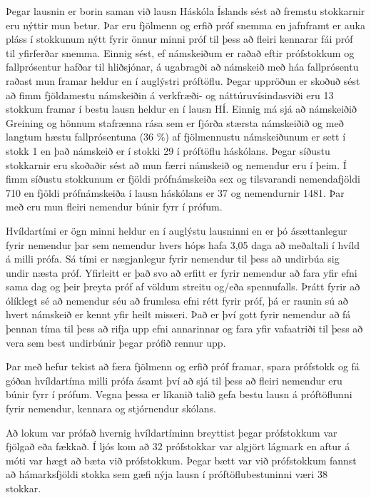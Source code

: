 \documentclass[12pt]{article}
\begin{document}
Þegar lausnin er borin saman við lausn Háskóla Íslands sést að fremstu stokkarnir eru nýttir mun betur. Þar eru fjölmenn og erfið próf snemma en jafnframt er auka pláss í stokkunum nýtt fyrir önnur minni próf til þess að fleiri kennarar fái próf til yfirferðar snemma. 
\medskip
Einnig sést, ef námskeiðum er raðað eftir prófstokkum og fallprósentur hafðar til hliðsjónar, á ugabragði að námskeið með háa fallprósentu raðast mun framar heldur en í auglýstri próftöflu.  
\medskip
Þegar uppröðun er skoðuð sést að fimm fjöldamestu námskeiðin á verkfræði- og náttúruvísindasviði eru 13 stokkum framar í bestu lausn heldur en í lausn HÍ. Einnig má sjá að námskeiðið Greining og hönnum stafrænna rása sem er fjórða stærsta námskeiðið og með langtum hæstu fallprósentuna (36 \%) af fjölmennustu námskeiðunum er sett í stokk 1 en það námskeið er í stokki 29 í próftöflu háskólans.  
\medskip
Þegar síðustu stokkarnir eru skoðaðir sést að mun færri námskeið og nemendur eru í þeim. Í fimm síðustu stokkunum er fjöldi prófnámskeiða sex og tilsvarandi nemendafjöldi 710 en fjöldi prófnámskeiða í lausn háskólans er 37 og nemendurnir 1481. Þar með eru mun fleiri nemendur búnir fyrr í prófum. 
\medskip

Hvíldartími er ögn minni heldur en í auglýstu lausninni en er þó ásættanlegur fyrir nemendur þar sem nemendur hvers hóps hafa 3,05 daga að meðaltali í hvíld á milli prófa. Sá tími er nægjanlegur fyrir nemendur til þess að undirbúa sig undir næsta próf. Yfirleitt er það svo að erfitt er fyrir nemendur að fara yfir efni sama dag og þeir þreyta próf af völdum streitu og/eða spennufalls. Þrátt fyrir að ólíklegt sé að nemendur séu að frumlesa efni rétt fyrir próf, þá er raunin sú að hvert námskeið er kennt yfir heilt misseri. Það er því gott fyrir nemendur að fá þennan tíma til þess að rifja upp efni annarinnar og fara yfir vafaatriði til þess að vera sem best undirbúnir þegar prófið rennur upp.
\medskip 

Þar með hefur tekist að færa fjölmenn og erfið próf framar, spara prófstokk og fá góðan hvíldartíma milli prófa ásamt því að sjá til þess að fleiri nemendur eru búnir fyrr í prófum. Vegna þessa er líkanið talið gefa bestu lausn á próftöflunni fyrir nemendur, kennara og stjórnendur skólans. 


\newpage

Að lokum var prófað hvernig hvíldartíminn breyttist þegar prófstokkum var fjölgað eða fækkað. Í ljós kom að 32 prófstokkar var algjört lágmark en aftur á móti var hægt að bæta við prófstokkum. Þegar bætt var við prófstokkum fannst að hámarksfjöldi stokka sem gæfi nýja lausn í próftöflubestuninni væri 38 stokkar. 
\end{document}
